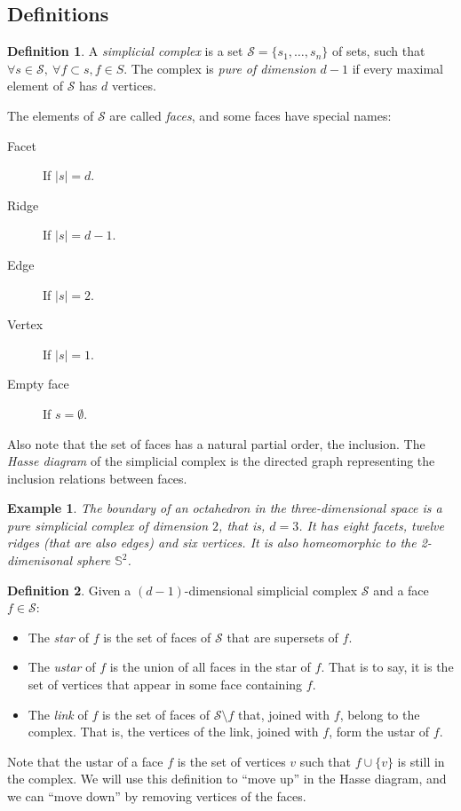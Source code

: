 \documentclass[12pt,a4paper]{article}
\theoremstyle{plain}
\newtheorem*{example}{Example}
\theoremstyle{definition}
\newtheorem{definition}{Definition}
\begin{document}
\subsection{Definitions}
\begin{definition}
  A \emph{simplicial complex}  is a set $\mathcal{S}=\{s_1,\dots,s_n\}$ of sets, such that  $\forall s\in \mathcal{S}, \  \forall f\subset s, f\in{S}$. The complex is \emph{pure of dimension $d-1$} if every maximal element of $\mathcal{S}$ has $d$ vertices.

  The elements of $\mathcal{S}$ are called \emph{faces}, and some faces have special names:
  \begin{description}
    \item[Facet] If $|s|=d$.
    \item[Ridge] If $|s|=d-1$.
    \item[Edge] If $|s|=2$.
    \item[Vertex] If $|s|=1$.
    \item[Empty face] If $s=\emptyset$.
  \end{description}
  Also note that the set of faces has a natural partial order, the inclusion. The \emph{Hasse diagram} of the simplicial complex is the directed graph representing the inclusion relations between faces.
\end{definition}

\begin{example}
  The boundary of an octahedron in the three-dimensional space is a pure simplicial complex of dimension $2$, that is, $d=3$. It has eight facets, twelve ridges (that are also edges) and six vertices. It is also homeomorphic to the 2-dimenisonal sphere $\mathbb{S}^2$.
\end{example}

\begin{definition}
  Given a $(d-1)$-dimensional simplicial complex $\mathcal{S}$ and a face $f\in\mathcal{S}$:
  \begin{itemize}
    \item The \emph{star} of $f$ is the set of faces of $\mathcal{S}$ that are supersets of $f$.
    \item The \emph{ustar} of $f$ is the union of all faces in the star of $f$. That is to say, it is the set of vertices that appear in some face containing $f$.
    \item The \emph{link} of $f$ is the set of faces of $\mathcal{S}\setminus f$  that, joined with $f$, belong to the complex. That is, the vertices of the link, joined with $f$, form the ustar of $f$.
  \end{itemize}
  Note that the ustar of a face $f$ is the set of vertices $v$ such that $f\cup \{v\}$ is still in the complex. We will use this definition to ``move up'' in the Hasse diagram, and we can ``move down'' by removing vertices of the faces.
\end{definition}
\end{document}
